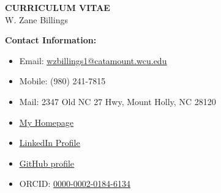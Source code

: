 \documentclass[11pt]{article}
\begin{document}
\begin{center}
\large{
	{\bf CURRICULUM VITAE} \\
	W. Zane Billings \\}
	\hrulefill
\end{center}

\normalsize

{\bf Contact Information:}
\begin{itemize}[noitemsep]
\item Email: \href{mailto:wzbillings1@catamount.wcu.edu}{\ul{wzbillings1@catamount.wcu.edu}}
\item Mobile: (980) 241-7815
\item Mail: 2347 Old NC 27 Hwy, Mount Holly, NC 28120
\item \href{https://wz-billings.rbind.io}{\ul{My Homepage}}
\item \href{https://www.linkedin.com/in/zane-b/}{\ul{LinkedIn Profile}}
\item \href{https://github.com/wz-billings}{\ul{GitHub profile}}
\item ORCID: \href{https://orcid.org/0000-0002-0184-6134}{\ul{0000-0002-0184-6134}}
\end{itemize}

\vspace{0.2in}


\vspace{0.2in}


\vspace{0.2in}


\vspace{0.2in}


\vspace{0.2in}


\vspace{0.2in}

\end{document}
